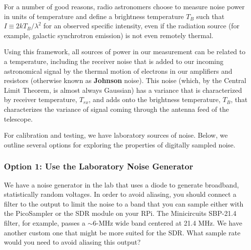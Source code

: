 \documentclass[11pt,preprint]{aastex}
\begin{document}
For a number of good reasons, radio astronomers choose to measure noise
power in units of temperature and define a brightness temperature
$T_B$ such that $I\equiv2kT_B/\lambda^2$ for an observed specific intensity,
even if the radiation source (for example, galactic synchrotron emission) is not even remotely thermal.

Using this framework, all sources of power in our measurement can be related to a temperature,
including the receiver noise that is added to our incoming astronomical signal 
by the thermal motion of electrons in our amplifiers and resistors 
(otherwise known as {\bf Johnson} noise).  This noise (which,
by the Central Limit Theorem, is almost always Gaussian) has a variance that
is characterized by receiver temperature, $T_{rx}$, and adds onto the brightness temperature, $T_B$, 
that characterizes the variance of signal coming through the antenna feed of the telescope.

For calibration and testing, we have laboratory sources of noise. Below, we outline
several options for exploring
the properties of digitally sampled noise.

\subsubsection{Option 1: Use the Laboratory Noise Generator}

\noindent
We have a noise generator in the lab that uses a diode to generate broadband,
statistically random voltages. In order to avoid aliasing, you should connect
a filter to the output to limit the noise to a band that you can sample either
with the PicoSampler or the SDR module on your RPi. The 
Minicircuits SBP-21.4 filter, for example, passes a $\sim 6$-MHz wide band centered
at 21.4 MHz. We have another custom one that might be more suited for the SDR.
What sample rate would you need to avoid aliasing this output? 
\end{document}
